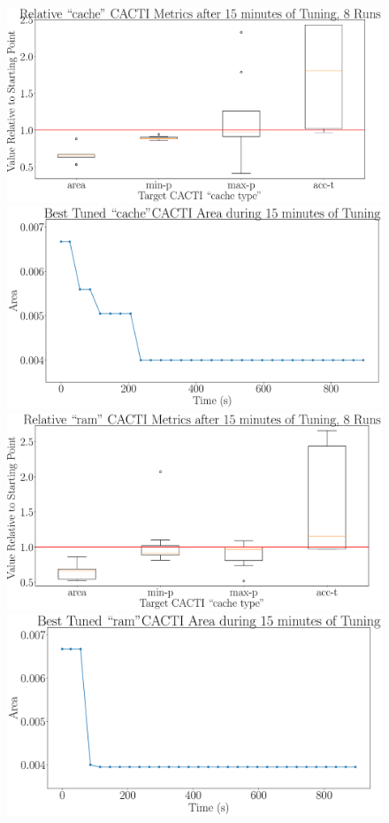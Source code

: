 \documentclass[12pt, a4paper]{article}
\begin{document}
\begin{figure}[htpb]
    \centering
    \begin{minipage}{.48\textwidth}
        \centering
        \includegraphics[width=.8\textwidth]{target_area_900_1_cache}
    \end{minipage}%
    \begin{minipage}{.48\textwidth}
        \centering
        \includegraphics[width=.8\textwidth]{target_area_900_1_cache_best}
    \end{minipage}%

    \begin{minipage}{.48\textwidth}
        \centering
        \includegraphics[width=.8\textwidth]{target_area_900_1_ram}
    \end{minipage}%
    \begin{minipage}{.48\textwidth}
        \centering
        \includegraphics[width=.8\textwidth]{target_area_900_1_ram_best}
    \end{minipage}%


\end{figure}
\end{document}
